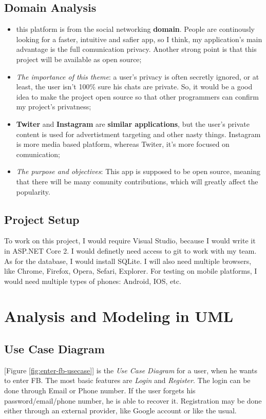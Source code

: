 \documentclass{article}
\begin{document}
		\subsection{Domain Analysis}
			\begin{itemize}
				\item this platform is from the social networking \textbf{domain}. People are continously looking for a faster, intuitive and safier app, so I think, my application's main advantage is the full comunication privacy. Another strong point is that this project will be available as open source;
				
				\item \textit{The importance of this theme}: a user's privacy is often secretly ignored, or at least, the user isn't 100\% sure his chats are private. So, it would be a good idea to make the project open source so that other programmers can confirm my project's privatness;
				
				\item \textbf{Twiter} and \textbf{Instagram} are \textbf{similar applications}, but the user's private content is used for advertistment targeting and other nasty things. Instagram is more media based platform, whereas Twiter, it's more focused on comunication;
				
				\item \textit{The purpose and objectives}: This app is supposed to be open source, meaning that there will be many comunity contributions, which will greatly affect the popularity.
			\end{itemize}

		\subsection{Project Setup}
			To work on this project, I would require Visual Studio, because I would write it in ASP.NET Core 2. I would definetly need access to git to work with my team. As for the database, I would install SQLite. I will also need multiple browsers, like Chrome, Firefox, Opera, Sefari, Explorer. For testing on mobile platforms, I would need multiple types of phones: Android, IOS, etc.

	\section{Analysis and Modeling in UML}
		\subsection{Use Case Diagram}
			[Figure \ref{fig:enter-fb-usecase}] is the \textit{Use Case Diagram} for a user, when he wants to enter FB. The most basic features are \textit{Login} and \textit{Register}. The login can be done through Email or Phone number. If the user forgets his password/email/phone number, he is able to recover it. Registration may be done either through an external provider, like Google account or like the usual.
			
\end{document}
